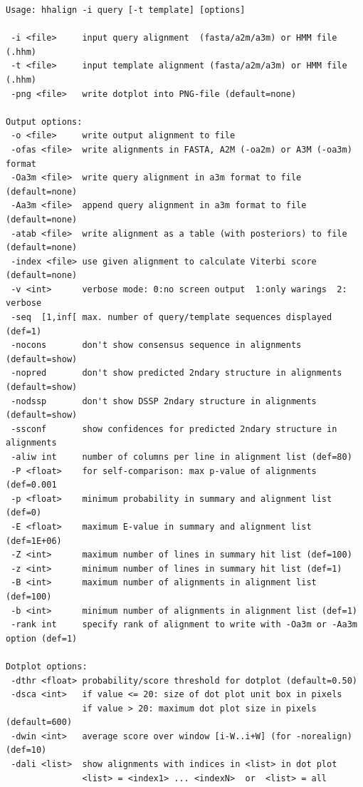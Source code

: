 \documentclass[11pt,a4paper]{article}
\begin{document}
\small 
\begin{verbatim}
Usage: hhalign -i query [-t template] [options]  

 -i <file>     input query alignment  (fasta/a2m/a3m) or HMM file (.hhm)
 -t <file>     input template alignment (fasta/a2m/a3m) or HMM file (.hhm)
 -png <file>   write dotplot into PNG-file (default=none)           

Output options:                                                           
 -o <file>     write output alignment to file
 -ofas <file>  write alignments in FASTA, A2M (-oa2m) or A3M (-oa3m) format   
 -Oa3m <file>  write query alignment in a3m format to file (default=none)
 -Aa3m <file>  append query alignment in a3m format to file (default=none)
 -atab <file>  write alignment as a table (with posteriors) to file (default=none)
 -index <file> use given alignment to calculate Viterbi score (default=none)
 -v <int>      verbose mode: 0:no screen output  1:only warings  2: verbose
 -seq  [1,inf[ max. number of query/template sequences displayed  (def=1)  
 -nocons       don't show consensus sequence in alignments (default=show) 
 -nopred       don't show predicted 2ndary structure in alignments (default=show) 
 -nodssp       don't show DSSP 2ndary structure in alignments (default=show) 
 -ssconf       show confidences for predicted 2ndary structure in alignments
 -aliw int     number of columns per line in alignment list (def=80)
 -P <float>    for self-comparison: max p-value of alignments (def=0.001
 -p <float>    minimum probability in summary and alignment list (def=0) 
 -E <float>    maximum E-value in summary and alignment list (def=1E+06)     
 -Z <int>      maximum number of lines in summary hit list (def=100)       
 -z <int>      minimum number of lines in summary hit list (def=1)       
 -B <int>      maximum number of alignments in alignment list (def=100)    
 -b <int>      minimum number of alignments in alignment list (def=1)    
 -rank int     specify rank of alignment to write with -Oa3m or -Aa3m option (def=1)

Dotplot options:
 -dthr <float> probability/score threshold for dotplot (default=0.50)        
 -dsca <int>   if value <= 20: size of dot plot unit box in pixels           
               if value > 20: maximum dot plot size in pixels (default=600)   
 -dwin <int>   average score over window [i-W..i+W] (for -norealign) (def=10)
 -dali <list>  show alignments with indices in <list> in dot plot            
               <list> = <index1> ... <indexN>  or  <list> = all              


\end{verbatim}
\end{document}

